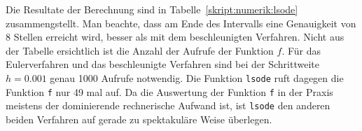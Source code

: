 Die Resultate der Berechnung sind in Tabelle~\ref{skript:numerik:lsode}
zusammengstellt.
Man beachte, dass am Ende des Intervalls eine Genauigkeit von
8 Stellen erreicht wird, besser als mit dem beschleunigten
Verfahren.
Nicht aus der Tabelle ersichtlich ist die Anzahl der Aufrufe der
Funktion $f$.
Für das Eulerverfahren und das beschleunigte Verfahren sind bei
der Schrittweite $h=0.001$ genau 1000 Aufrufe notwendig.
Die Funktion \texttt{lsode} ruft dagegen die Funktion \texttt{f}
nur 49 mal auf.
Da die Auswertung der Funktion \texttt{f} in der Praxis meistens
der dominierende rechnerische Aufwand ist, ist \texttt{lsode}
den anderen beiden Verfahren auf gerade zu spektakuläre Weise überlegen.









